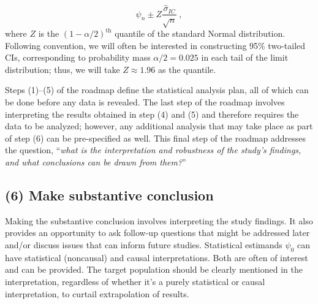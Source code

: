 \documentclass[
  12pt, krantz2,
]{krantz}
\newcommand{\1}{\mathbbm{1}}
\theoremstyle{definition}
\theoremstyle{definition}
\theoremstyle{definition}
\theoremstyle{definition}
\theoremstyle{remark}
\begin{document}
\begin{equation*}
  \psi_n \pm Z \frac{\hat{\sigma}_{IC}}{\sqrt{n}} \ ,
\end{equation*}
where \(Z\) is the \((1 - \alpha / 2)^\text{th}\) quantile of the standard Normal
distribution. Following convention, we will often be interested in constructing
95\% two-tailed CIs, corresponding to probability mass \(\alpha/2 = 0.025\) in each
tail of the limit distribution; thus, we will take \(Z \approx 1.96\) as the
quantile.

Steps (1)--(5) of the roadmap define the statistical analysis plan, all of which
can be done before any data is revealed. The last step of the roadmap involves
interpreting the results obtained in step (4) and (5) and therefore requires the
data to be analyzed; however, any additional analysis that may take place as
part of step (6) can be pre-specified as well. This final step of the roadmap
addresses the question, ``\emph{what is the interpretation and robustness of the
study's findings, and what conclusions can be drawn from them?}''

\hypertarget{make-substantive-conclusion}{%
\subsection*{(6) Make substantive conclusion}\label{make-substantive-conclusion}}


Making the substantive conclusion involves interpreting the study findings. It
also provides an opportunity to ask follow-up questions that might be addressed
later and/or discuss issues that can inform future studies. Statistical
estimands \(\psi_0\) can have statistical (noncausal) and causal interpretations.
Both are often of interest and can be provided. The target population should be
clearly mentioned in the interpretation, regardless of whether it's a purely
statistical or causal interpretation, to curtail extrapolation of results.
\end{document}
